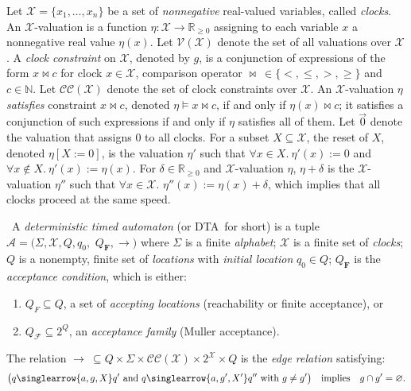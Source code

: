\documentclass{LMCS}
\renewcommand{\emptyset}{\varnothing}
\newcommand{\mc}[1]{\mathcal{#1}}
\newcommand{\<}{\langle}
\renewcommand{\>}{\rangle}
\newcommand{\ges}{\geqslant}
\newcommand{\mX}{\mathcal{X}}
\newcommand{\mF}{\mathcal{F}}
\newcommand{\DTA}{\textsc{DTA}}
\newcommand{\mv}[1]{\singlearrow{#1}}
\newcommand{\Nats}{\mathbb{N}}
\newcommand{\Reals}{\mathbb{R}}
\begin{document}
\newcommand{\mCC}{\mathcal{C}\mathcal{C}}
\newcommand{\mRe}{\mathcal{R}e}

Let $\mX = \{x_1,\ldots\!, x_n\}$ be a set of \emph{nonnegative} real-valued variables,
called \emph{clocks}.
An $\mc{X}$-valuation is a function $\eta:\mX\to \Reals_{\ges 0}$ assigning
to each variable $x$ a nonnegative real value $\eta(x)$.
Let $\mc{V}(\mc{X})$ denote the set of all valuations over $\mc{X}$.
A \emph{clock constraint} on $\mc{X}$, denoted by $g$, is a conjunction of expressions
of the form $x \bowtie c$ for clock $x \in \mc{X}$, comparison operator $\bowtie\ \in
\{<, \leqslant, >, \geqslant\}$ and $c \in \Nats$.
Let $\mCC(\mc{X})$ denote the set of clock constraints over $\mc{X}$.
An $\mc{X}$-valuation $\eta$ \emph{satisfies} constraint $x \bowtie c$, denoted
$\eta \models x \bowtie c$, if and only if $\eta(x) \bowtie c$; it satisfies a conjunction
of such expressions if and only if $\eta$ satisfies all of them.
Let $\vec{0}$ denote the valuation that assigns 0 to all clocks.
For a subset $X\subseteq \mc{X}$, the reset of $X$, denoted $\eta[X\!:=0]$, is the
valuation $\eta'$ such that $\forall x\in X.\ \eta'(x)\!:=0$ and
$\forall x\notin X.\ \eta'(x)\!:=\eta(x)$.
For $\delta\in \Reals_{\geqslant 0}$ and $\mc{X}$-valuation $\eta$, $\eta{+}\delta$
is the $\mc{X}$-valuation $\eta''$ such that $\forall x\in \mc{X}$. $\eta''(x)\!:=\eta(x)
{+}\delta$, which implies that all clocks proceed at the same speed.

\begin{defi}[\DTA]\ A \emph{deterministic timed automaton} (or
  \DTA\ for short)
is a tuple $\mc{A}=(\Sigma,\mc{X},Q,q_0,$ $Q_\mathbf{F},\rightarrow)$ where
$\Sigma$ is a finite \emph{alphabet}; $\mc{X}$ is a finite set of \emph{clocks};
$Q$ is a nonempty, finite set of \emph{locations} with \emph{initial location}
$q_0\in Q$; $Q_\mathbf{F}$ is the \emph{acceptance condition}, which is either:
\begin{enumerate}[$\bullet$]
\item
$Q_F\subseteq Q$, a set of \emph{accepting locations} (reachability or finite acceptance), or
\item
$Q_\mF\subseteq 2^Q$, an \emph{acceptance family} (Muller acceptance).
\end{enumerate}
The relation $\rightarrow\ \subseteq Q\times \Sigma\times \mCC(\mc{X})\times
2^{\mc{X}}\times Q$ is the \emph{edge relation} satisfying:
$$
\big(q\mv{a,g,X}q' \mbox{ and } q\mv{a,g',X'}q'' \mbox{ with } g
\neq g'\big) \quad \mbox{implies} \quad g \cap g' = \emptyset.
$$
\end{defi}
\end{document}
